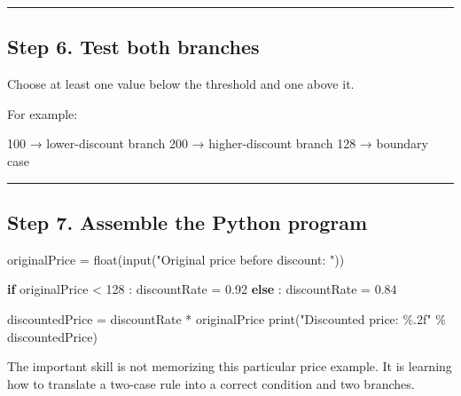 \documentclass[
  11pt,
  a4paper,
]{article}
\newenvironment{Shaded}{}{}
\newcommand{\BuiltInTok}[1]{\textcolor[rgb]{0.00,0.50,0.00}{#1}}
\newcommand{\ControlFlowTok}[1]{\textcolor[rgb]{0.00,0.44,0.13}{\textbf{#1}}}
\newcommand{\DecValTok}[1]{\textcolor[rgb]{0.25,0.63,0.44}{#1}}
\newcommand{\FloatTok}[1]{\textcolor[rgb]{0.25,0.63,0.44}{#1}}
\newcommand{\NormalTok}[1]{#1}
\newcommand{\OperatorTok}[1]{\textcolor[rgb]{0.40,0.40,0.40}{#1}}
\newcommand{\SpecialCharTok}[1]{\textcolor[rgb]{0.25,0.44,0.63}{#1}}
\newcommand{\StringTok}[1]{\textcolor[rgb]{0.25,0.44,0.63}{#1}}
\begin{document}
\begin{center}\rule{0.5\linewidth}{0.5pt}\end{center}

\subsection{Step 6. Test both
branches}\label{step-6.-test-both-branches}

Choose at least one value below the threshold and one above it.

For example:

\begin{Shaded}
\begin{Highlighting}[]
\NormalTok{100  → lower{-}discount branch}
\NormalTok{200  → higher{-}discount branch}
\NormalTok{128  → boundary case}
\end{Highlighting}
\end{Shaded}

\begin{center}\rule{0.5\linewidth}{0.5pt}\end{center}

\subsection{Step 7. Assemble the Python
program}\label{step-7.-assemble-the-python-program}

\begin{Shaded}
\begin{Highlighting}[]
\NormalTok{originalPrice }\OperatorTok{=} \BuiltInTok{float}\NormalTok{(}\BuiltInTok{input}\NormalTok{(}\StringTok{"Original price before discount: "}\NormalTok{))}

\ControlFlowTok{if}\NormalTok{ originalPrice }\OperatorTok{\textless{}} \DecValTok{128}\NormalTok{ :}
\NormalTok{    discountRate }\OperatorTok{=} \FloatTok{0.92}
\ControlFlowTok{else}\NormalTok{ :}
\NormalTok{    discountRate }\OperatorTok{=} \FloatTok{0.84}

\NormalTok{discountedPrice }\OperatorTok{=}\NormalTok{ discountRate }\OperatorTok{*}\NormalTok{ originalPrice}
\BuiltInTok{print}\NormalTok{(}\StringTok{"Discounted price: }\SpecialCharTok{\%.2f}\StringTok{"} \OperatorTok{\%}\NormalTok{ discountedPrice)}
\end{Highlighting}
\end{Shaded}

The important skill is not memorizing this particular price example. It
is learning how to translate a two-case rule into a correct condition
and two branches.
\end{document}
